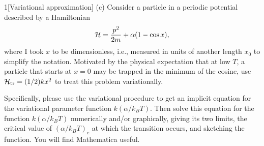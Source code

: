 \documentclass[12pt]{article}
\begin{document}
\begin{problem}{1}[Variational approximation]
(c) Consider a particle in a periodic potential described by a Hamiltonian
\begin{equation}
    \mathcal{H}=\frac{p^2}{2m}+\alpha(1-\cos x), 
\end{equation}
where I took $x$ to be dimensionless, i.e., measured in units of another length
$x_0$ to simplify the notation. Motivated by the physical expectation that at
low $T$, a particle that starts at $x=0$ may be trapped in the minimum of the
cosine, use $\mathcal{H}_{\text{tr}}=(1/2)kx^2$ to treat this problem variationally.

Specifically, please use the variational procedure to get an implicit equation
for the variational parameter function $k(\alpha/k_BT)$. Then solve this
equation for the function $k(\alpha/k_BT)$ numerically and/or graphically,
giving its two limits, the critical value of $(\alpha/k_BT)_c$ at which the
transition occurs, and sketching the function. You will find Mathematica useful.


\end{problem}
\end{document}
